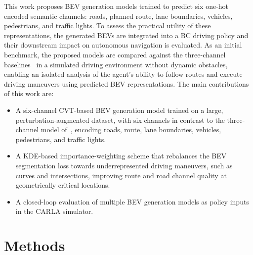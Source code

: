 \documentclass[12pt]{article}
\begin{document}
This work proposes BEV generation models trained to predict six one-hot encoded semantic channels: roads, planned route, lane boundaries, vehicles, pedestrians, and traffic lights. To assess the practical utility of these representations, the generated BEVs are integrated into a BC driving policy and their downstream impact on autonomous navigation is evaluated. As an initial benchmark, the proposed models are compared against the three-channel baselines~\cite{santos2025initial} in a simulated driving environment without dynamic obstacles, enabling an isolated analysis of the agent's ability to follow routes and execute driving maneuvers using predicted BEV representations.
The main contributions of this work are:
\begin{itemize}
    \item A six-channel CVT-based BEV generation model trained on a large, perturbation-augmented dataset, with six channels in contrast to the three-channel model of~\cite{santos2025initial}, encoding roads, route, lane boundaries, vehicles, pedestrians, and traffic lights.
    \item A KDE-based importance-weighting scheme that rebalances the BEV segmentation loss towards underrepresented driving maneuvers, such as curves and intersections, improving route and road channel quality at geometrically critical locations.
    \item A closed-loop evaluation of multiple BEV generation models as policy inputs in the CARLA simulator.
\end{itemize}

\section{Methods}
\label{sec:methods}

\end{document}
